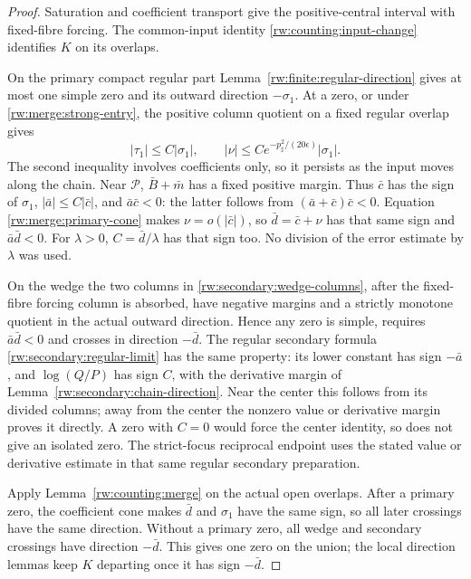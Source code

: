 \begin{proof}
Saturation and coefficient transport give the positive-central
interval with fixed-fibre forcing. The common-input identity
\eqref{rw:counting:input-change} identifies $K$ on its overlaps.

On the primary compact regular part
Lemma~\ref{rw:finite:regular-direction} gives at most one
simple zero and its outward direction $-\sigma_1$.
At a zero, or under \eqref{rw:merge:strong-entry}, the
positive column quotient on a fixed regular overlap gives
\begin{equation}\label{rw:merge:primary-cone}
 |\tau_1|\le C|\sigma_1|,\qquad
 |\nu|\le C e^{-p_\sharp^2/(20\epsilon)}|\sigma_1|.
\end{equation}
The second inequality involves coefficients only, so it persists
as the input moves along the chain.
Near $\mathcal P$, $\bar B+\bar m$ has a fixed positive
margin. Thus $\bar c$ has the sign of $\sigma_1$,
$|\bar a|\le C|\bar c|$, and
$\bar a\bar c<0$: the latter follows from
$(\bar a+\bar c)\bar c<0$.
Equation \eqref{rw:merge:primary-cone} makes
$\nu=o(|\bar c|)$, so $\bar d=\bar c+\nu$ has that same
sign and $\bar a\bar d<0$.
For $\lambda>0$, $C=\bar d/\lambda$ has that sign too.
No division of the error estimate by $\lambda$ was used.

On the wedge the two columns in
\eqref{rw:secondary:wedge-columns}, after the fixed-fibre
forcing column is absorbed, have negative margins and a
strictly monotone quotient in the actual outward direction.
Hence any zero is simple, requires $\bar a\bar d<0$ and
crosses in direction $-\bar d$. The regular secondary
formula \eqref{rw:secondary:regular-limit} has the same
property: its lower constant has sign $-\bar a$, and
$\log(Q/P)$ has sign $C$, with the derivative margin of
Lemma~\ref{rw:secondary:chain-direction}.
Near the center this follows from its divided columns;
away from the center the nonzero value or derivative margin
proves it directly. A zero with $C=0$ would force the
center identity, so does not give an isolated zero.
The strict-focus reciprocal endpoint uses the stated value
or derivative estimate in that same regular secondary
preparation.

Apply Lemma~\ref{rw:counting:merge} on the actual open overlaps.
After a primary zero, the coefficient cone makes $\bar d$ and
$\sigma_1$ have the same sign, so all later crossings have the
same direction. Without a primary zero, all wedge and secondary
crossings have direction $-\bar d$. This gives one zero on the
union; the local direction lemmas keep $K$ departing once it has
sign $-\bar d$.


\end{proof}

